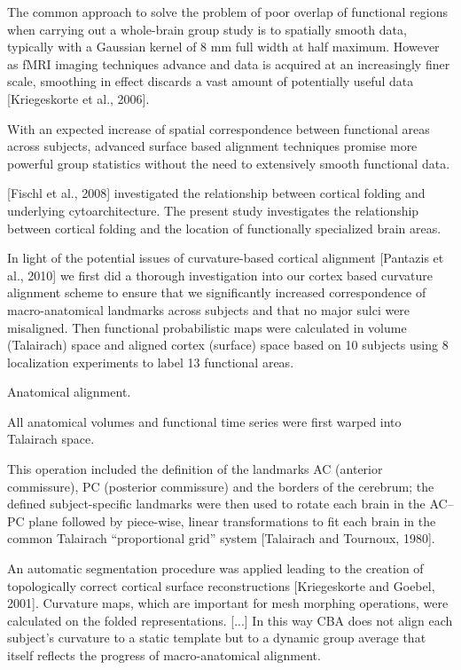 %
The common approach to solve the problem of poor overlap of functional regions
when carrying out a whole-brain group study is to spatially smooth data,
typically with a Gaussian kernel of 8 mm full width at half maximum.
%
However as fMRI imaging techniques advance and data is acquired at an
increasingly finer scale, smoothing in effect discards a vast amount of
potentially useful data [Kriegeskorte et al., 2006].

%
With an expected increase of spatial correspondence between functional areas
across subjects, advanced surface based alignment techniques promise more
powerful group statistics without the need to extensively smooth functional
data.

%
[Fischl et al., 2008] investigated the relationship between cortical folding and
underlying cytoarchitecture.
%
The present study investigates the relationship between cortical folding and the
location of functionally specialized brain areas.

%
In light of the potential issues of curvature-based cortical alignment [Pantazis
et al., 2010] we first did a thorough investigation into our cortex based
curvature alignment scheme to ensure that we significantly increased
correspondence of macro-anatomical landmarks across subjects and that no major
sulci were misaligned.
%
Then functional probabilistic maps were calculated in volume (Talairach) space
and aligned cortex (surface) space based on 10 subjects using 8 localization
experiments to label 13 functional areas.


Anatomical alignment.

All anatomical volumes and functional time series were first warped into
Talairach space.

%
This operation included the definition of the landmarks AC (anterior
commissure), PC (posterior commissure) and the borders of the cerebrum; the
defined subject-specific landmarks were then used to rotate each brain in the
AC–PC plane followed by piece-wise, linear transformations to fit each brain in
the common Talairach “proportional grid” system [Talairach and Tournoux, 1980].

%
An automatic segmentation procedure was applied leading to the creation of
topologically correct cortical surface reconstructions [Kriegeskorte and Goebel,
2001].
%
Curvature maps, which are important for mesh morphing operations, were
calculated on the folded representations.
%
[...] In this way CBA does not align each subject's curvature to a static
template but to a dynamic group average that itself reflects the progress of
macro-anatomical alignment.

